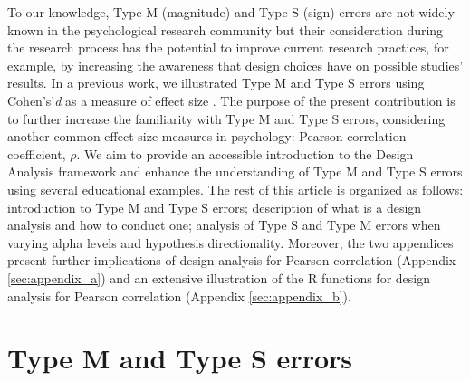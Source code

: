 \documentclass{article}\usepackage[]{graphicx}\usepackage[]{color}
\begin{document}
To our knowledge, Type M (magnitude) and Type S (sign) errors are not widely known in the psychological research community but their consideration during the research process has the potential to improve current research practices, for example, by increasing the awareness that design choices have on possible studies' results. In a previous work, we illustrated Type M and Type S errors using Cohen's’\emph{d} as a measure of effect size \parencite{altoeEnhancingStatisticalInference2020}. The purpose of the present contribution is to further increase the familiarity with Type M and Type S errors, considering another common effect size measures in psychology: Pearson correlation coefficient, $\rho$. We aim to provide an accessible introduction to the Design Analysis framework and enhance the understanding of Type M and Type S errors using several educational examples. The rest of this article is organized as follows: introduction to Type M and Type S errors; description of what is a design analysis and how to conduct one; analysis of Type S and Type M errors when varying alpha levels and hypothesis directionality. Moreover, the two appendices present further implications of design analysis for Pearson correlation (Appendix \ref{sec:appendix_a}) and an extensive illustration of the R functions for design analysis for Pearson correlation (Appendix \ref{sec:appendix_b}).


\section{Type M and Type S errors }
\end{document}
